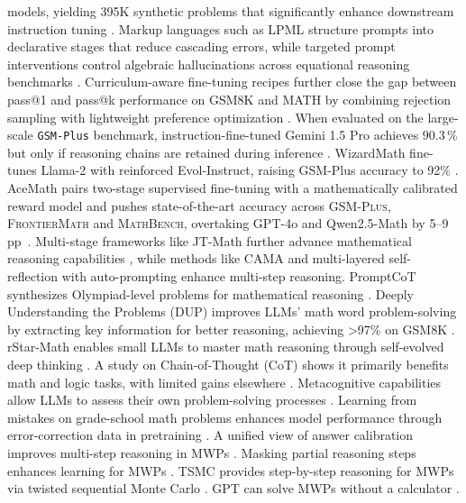 \documentclass[acmsmall,anonymous]{acmart}
\begin{document}
models, yielding 395K synthetic problems that significantly enhance downstream instruction tuning \cite{yu-2024-metamath}. Markup languages such as LPML structure prompts into declarative stages that reduce cascading errors, while targeted prompt interventions control algebraic hallucinations across equational reasoning benchmarks \cite{yamauchi-2023-lpml,meadows-2025-prompt-interventions}.  Curriculum-aware fine-tuning recipes further close the gap between pass@1 and pass@k performance on GSM8K and MATH by combining rejection sampling with lightweight preference optimization \cite{liu-2023-improving-finetune}.  When evaluated on the large-scale \texttt{GSM-Plus} benchmark, instruction-fine-tuned Gemini 1.5 Pro achieves $90.3\,\%$ but only if reasoning chains are retained during inference \cite{li2024gsmplus}. WizardMath fine-tunes Llama-2 with reinforced Evol-Instruct, raising GSM-Plus accuracy to 92\% \cite{luo2025wizardmath}.  AceMath pairs two-stage supervised fine-tuning with a mathematically
calibrated reward model and pushes state-of-the-art accuracy across
\textsc{GSM-Plus}, \textsc{FrontierMath} and \textsc{MathBench}, overtaking GPT-4o and
Qwen2.5-Math by 5–9 pp~\citep{liu2024acemath}. Multi-stage frameworks like JT-Math further advance mathematical reasoning capabilities \cite{anonymous2025jtmath,anonymous2025jtmath}, while methods like CAMA \cite{anonymous2025cama,anonymous2025cama} and multi-layered self-reflection with auto-prompting \cite{anonymous2025advancingmultistep,anonymous2025advancingmultistep} enhance multi-step reasoning. PromptCoT synthesizes Olympiad-level problems for mathematical reasoning \cite{zhao-etal-2025-promptcot}. Deeply Understanding the Problems (DUP) improves LLMs' math word problem-solving by extracting key information for better reasoning, achieving >97\% on GSM8K \cite{zhong2024achieving}. rStar-Math enables small LLMs to master math reasoning through self-evolved deep thinking \cite{guan2025rstar}. A study on Chain-of-Thought (CoT) shows it primarily benefits math and logic tasks, with limited gains elsewhere \cite{sprague2024a to}. Metacognitive capabilities allow LLMs to assess their own problem-solving processes \cite{didolkar2024metacognitive}. Learning from mistakes on grade-school math problems enhances model performance through error-correction data in pretraining \cite{ye2024physics}. A unified view of answer calibration improves multi-step reasoning in MWPs \cite{deng2023}. Masking partial reasoning steps enhances learning for MWPs \cite{chen2024a}. TSMC provides step-by-step reasoning for MWPs via twisted sequential Monte Carlo \cite{feng2024}. GPT can solve MWPs without a calculator \cite{yang2023b}.
\end{document}

